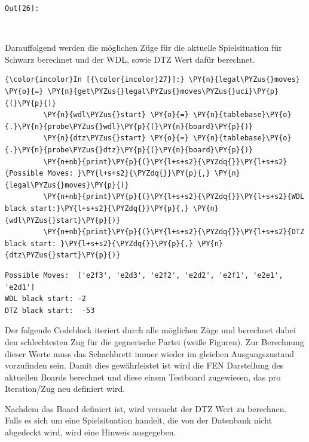 \texttt{\color{outcolor}Out[{\color{outcolor}26}]:}
    
    \begin{center}
    \end{center}
    { \hspace*{\fill} \\}
    

    Darauffolgend werden die möglichen Züge für die aktuelle Spielsituation
für Schwarz berechnet und der WDL, sowie DTZ Wert dafür berechnet.

    \begin{Verbatim}[commandchars=\\\{\}]
{\color{incolor}In [{\color{incolor}27}]:} \PY{n}{legal\PYZus{}moves} \PY{o}{=} \PY{n}{get\PYZus{}legal\PYZus{}moves\PYZus{}uci}\PY{p}{(}\PY{p}{)}
         \PY{n}{wdl\PYZus{}start} \PY{o}{=} \PY{n}{tablebase}\PY{o}{.}\PY{n}{probe\PYZus{}wdl}\PY{p}{(}\PY{n}{board}\PY{p}{)}
         \PY{n}{dtz\PYZus{}start} \PY{o}{=} \PY{n}{tablebase}\PY{o}{.}\PY{n}{probe\PYZus{}dtz}\PY{p}{(}\PY{n}{board}\PY{p}{)}
         \PY{n+nb}{print}\PY{p}{(}\PY{l+s+s2}{\PYZdq{}}\PY{l+s+s2}{Possible Moves: }\PY{l+s+s2}{\PYZdq{}}\PY{p}{,} \PY{n}{legal\PYZus{}moves}\PY{p}{)}
         \PY{n+nb}{print}\PY{p}{(}\PY{l+s+s2}{\PYZdq{}}\PY{l+s+s2}{WDL black start:}\PY{l+s+s2}{\PYZdq{}}\PY{p}{,} \PY{n}{wdl\PYZus{}start}\PY{p}{)}
         \PY{n+nb}{print}\PY{p}{(}\PY{l+s+s2}{\PYZdq{}}\PY{l+s+s2}{DTZ black start: }\PY{l+s+s2}{\PYZdq{}}\PY{p}{,} \PY{n}{dtz\PYZus{}start}\PY{p}{)}
\end{Verbatim}


    \begin{Verbatim}[commandchars=\\\{\}]
Possible Moves:  ['e2f3', 'e2d3', 'e2f2', 'e2d2', 'e2f1', 'e2e1', 'e2d1']
WDL black start: -2
DTZ black start:  -53

    \end{Verbatim}

    Der folgende Codeblock iteriert durch alle möglichen Züge und berechnet
dabei den schlechtesten Zug für die gegnerische Partei (weiße Figuren).
Zur Berechnung dieser Werte muss das Schachbrett immer wieder im
gleichen Ausgangszustand vorzufinden sein. Damit dies gewährleistet ist
wird die FEN Darstellung des aktuellen Boards berechnet und diese einem
Testboard zugewiesen, das pro Iteration/Zug neu definiert wird.

Nachdem das Board definiert ist, wird versucht der DTZ Wert zu
berechnen. Falls es sich um eine Spielsituation handelt, die von der
Datenbank nicht abgedeckt wird, wird eine Hinweis ausgegeben.

